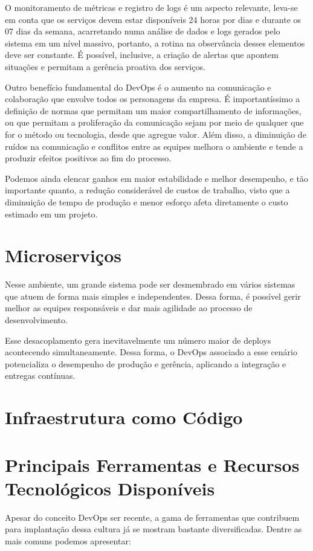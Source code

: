 O monitoramento de métricas e registro de logs é um aspecto relevante, leva-se em conta que os serviços devem estar disponíveis 24 horas por dias e durante os 07 dias da semana, acarretando numa análise de dados e logs gerados pelo sistema em um nível massivo, portanto, a rotina na observância desses elementos deve ser constante. É possível, inclusive, a criação de alertas que apontem situações e permitam a gerência proativa dos serviços.

Outro benefício fundamental do DevOps é o aumento na comunicação e colaboração que envolve todos os personagens da empresa. É importantíssimo a definição de normas que permitam um maior compartilhamento de informações, ou que permitam a proliferação da comunicação sejam por meio de qualquer que for o método ou tecnologia, desde que agregue valor. Além disso, a diminuição de ruídos na comunicação e conflitos entre as equipes melhora o ambiente e tende a produzir efeitos positivos ao fim do processo.

Podemos ainda elencar ganhos em maior estabilidade e melhor desempenho, e tão importante quanto, a redução considerável de custos de trabalho, visto que a diminuição de tempo de produção e menor esforço afeta diretamente o custo estimado em um projeto.



\section{Microserviços}

Nesse ambiente, um grande sistema pode ser desmembrado em vários sistemas que atuem de forma mais simples e independentes. Dessa forma, é possível gerir melhor as equipes responsáveis e dar mais agilidade ao processo de desenvolvimento.

Esse desacoplamento gera inevitavelmente um número maior de deploys acontecendo simultaneamente. Dessa forma, o DevOps associado a esse cenário potencializa o desempenho de produção e gerência, aplicando a integração e entregas contínuas.

\section{Infraestrutura como Código}

\section{Principais Ferramentas e Recursos Tecnológicos Disponíveis}
Apesar do conceito DevOps ser recente, a gama de ferramentas que contribuem para implantação dessa cultura já se mostram bastante diversificadas. Dentre as mais comuns podemos apresentar:

